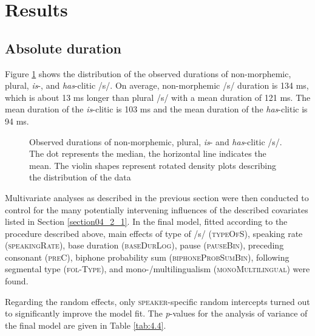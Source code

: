 \section{Results}\label{section04_3}

\subsection{Absolute duration}\label{section04_3_1}

Figure \ref{fig:4_3} shows the distribution of the observed durations of non-morphemic, plural, \textit{is}-, and \textit{has}-clitic /s/. On average, non-morphemic /s/ duration is 134 ms, which is about 13 ms longer than plural /s/ with a mean duration of 121 ms. The mean duration of the \textit{is}-clitic is 103 ms and the mean duration of the \textit{has}-clitic is 94 ms. 

\begin{figure}
    \centering
    
    \caption{Observed durations of non-morphemic, plural, \textit{is}- and \textit{has}-clitic /s/. The dot represents the median, the horizontal line indicates the mean. The violin shapes represent rotated density plots describing the distribution of the data}
    \label{fig:4_3}
\end{figure}

Multivariate analyses as described in the previous section were then conducted to control for the many potentially intervening influences of the described covariates listed in Section \ref{section04_2_1}. In the final model, fitted according to the procedure described above, main effects of type of /s/ (\textsc{typeOfS}), speaking rate (\textsc{speakingRate}), base duration (\textsc{baseDurLog}), pause (\textsc{pauseBin}), preceding consonant (\textsc{preC}), biphone probability sum (\textsc{biphoneProbSumBin}), following segmental type (\textsc{fol-Type}), and mono-/multilingualism (\textsc{monoMultilingual}) were found.

Regarding the random effects, only \textsc{speaker}-specific random intercepts turned out to significantly improve the model fit. The \textit{p}-values for the analysis of variance of the final model are given in Table \ref{tab:4.4}.

